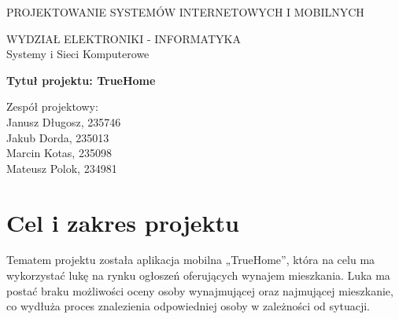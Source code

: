 \documentclass[polish, 11pt]{article}
\begin{document}
{
    \centering
    \Huge{PROJEKTOWANIE SYSTEMÓW INTERNETOWYCH I MOBILNYCH}
\vspace{2cm}

    \huge{WYDZIAŁ ELEKTRONIKI - INFORMATYKA \\ Systemy i Sieci Komputerowe}
\vspace{2cm}

    \LARGE{\textbf{Tytuł projektu: TrueHome}}
\vspace{3cm}

    \begin{flushright}
        Zespół projektowy:\\
        Janusz Długosz, 235746\\
        Jakub Dorda, 235013\\
        Marcin Kotas, 235098\\
        Mateusz Polok, 234981
        
    \end{flushright}
}
\newpage
\tableofcontents
\newpage

\section{Cel i zakres projektu}
    Tematem projektu została aplikacja mobilna „TrueHome”, która na celu ma wykorzystać lukę na rynku ogłoszeń oferujących wynajem mieszkania. Luka ma postać braku możliwości oceny osoby wynajmującej oraz najmującej mieszkanie, co wydłuża proces znalezienia odpowiedniej osoby w zależności od sytuacji.
    
\end{document}
